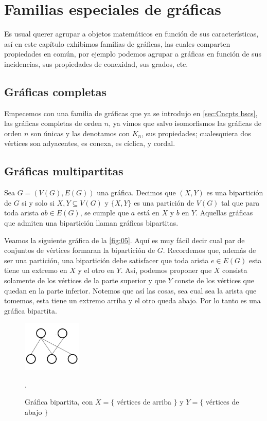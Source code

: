 \section{Familias especiales de gráficas}
\label{sec:Familias especiales de gráficas}

Es usual querer agrupar a objetos matemáticos en función de sus características, así en este capítulo exhibimos familias de gráficas, las cuales comparten propiedades en común, por ejemplo podemos agrupar a gráficas en función de sus incidencias, sus propiedades de conexidad, sus grados, etc.

\subsection{Gr\'aficas completas}

Empecemos con una familia de gráficas que ya se introdujo en \cref{sec:Cncpts bscs}, las gráficas completas de orden $n$, ya vimos que salvo isomorfismos las gráficas de orden $n$ son únicas y las denotamos con $K_n$, sus propiedades; cualesquiera dos vértices son adyacentes, es conexa, es cíclica, y cordal.

\subsection{Gr\'aficas multipartitas}
Sea $G=(V(G), E(G))$ una gráfica. Decimos que $(X,Y)$ es una bipartición de $G$ si y solo si $X,Y \subseteq V(G)$ y $\{X,Y\}$ es una partición de $V(G)$ tal que para toda arista $ab \in E(G)$, se cumple que $a$ est\'a en $X$ y $b$ en $Y$. Aquellas gráficas que admiten una bipartici\'on llaman gráficas bipartitas.


Veamos la siguiente gráfica de la \cref{fig:05}. Aquí es muy fácil decir cual par de conjuntos de vértices formaran la bipartición de $G$. Recordemos que, adem\'as de ser una partici\'on, una bipartici\'on debe satisfacer que toda arista $e \in E(G)$ esta tiene un extremo en $X$ y el otro en $Y$. Así, podemos proponer que $X$ consista solamente de los vértices de la parte superior y que $Y$ conste de los vértices que quedan en la parte inferior. Notemos que así las cosas, sea cual sea la arista que tomemos, esta tiene un extremo arriba y el otro queda abajo. Por lo tanto es una gráfica bipartita.

\begin{figure}[H]
  \centering
  \includegraphics[width=0.25\textwidth]{recursos/capturas/05.jpg}
  \caption{Gráfica bipartita, con $X=\{$ vértices de arriba $\} $ y $Y=\{$ vértices de abajo $\}$} .
  \label{fig:10}
\end{figure}


